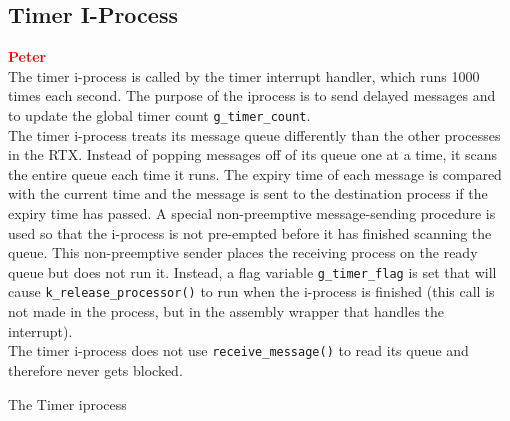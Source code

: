 \documentclass[12pt]{report}
\begin{document}
\subsection{Timer I-Process}

\textcolor{red}{\textbf{Peter}} \\

The timer i-process is called by the timer interrupt handler, which runs 1000 times each second. The purpose of the iprocess is to send delayed messages and to update the global timer count {\tt g\_timer\_count}.\\

The timer i-process treats its message queue differently than the other processes in the RTX. Instead of popping messages off of its queue one at a time, it scans the entire queue each time it runs. The expiry time of each message is compared with the current time and the message is sent to the destination process if the expiry time has passed. A special non-preemptive message-sending procedure is used so that the i-process is not pre-empted before it has finished scanning the queue. This non-preemptive sender places the receiving process on the ready queue but does not run it. Instead, a flag variable {\tt g\_timer\_flag} is set that will cause {\tt k\_release\_processor()} to run when the i-process is finished (this call is not made in the process, but in the assembly wrapper that handles the interrupt).\\

The timer i-process does not use {\tt receive\_message()} to read its queue and therefore never gets blocked.\\

\begin{algorithm}
  \caption{The Timer iprocess}
  \begin{algorithmic}[1]
			\EndIf
		\EndFor
    \EndProcedure
  \end{algorithmic}
\end{algorithm}


\end{document}
